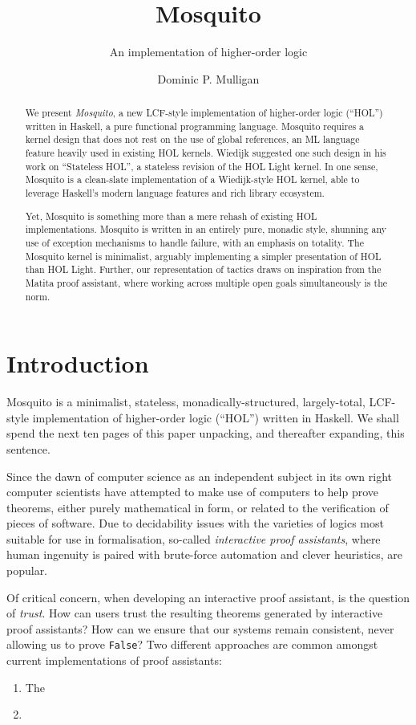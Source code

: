 \documentclass{llncs}
\author{Dominic P. Mulligan}
\title{Mosquito}
\subtitle{An implementation of higher-order logic}
\institute{Computer Laboratory, University of Cambridge}
\begin{document}
\maketitle

\begin{abstract}
We present \emph{Mosquito}, a new LCF-style implementation of higher-order logic (``HOL'') written in Haskell, a pure functional programming language.
Mosquito requires a kernel design that does not rest on the use of global references, an ML language feature heavily used in existing HOL kernels.
Wiedijk suggested one such design in his work on ``Stateless HOL'', a stateless revision of the HOL Light kernel.
In one sense, Mosquito is a clean-slate implementation of a Wiedijk-style HOL kernel, able to leverage Haskell's modern language features and rich library ecosystem.

Yet, Mosquito is something more than a mere rehash of existing HOL implementations.
Mosquito is written in an entirely pure, monadic style, shunning any use of exception mechanisms to handle failure, with an emphasis on totality.
The Mosquito kernel is minimalist, arguably implementing a simpler presentation of HOL than HOL Light.
Further, our representation of tactics draws on inspiration from the Matita proof assistant, where working across multiple open goals simultaneously is the norm.
\end{abstract}

\section{Introduction}
\label{sect.introduction}

Mosquito is a minimalist, stateless, monadically-structured, largely-total, LCF-style implementation of higher-order logic (``HOL'') written in Haskell.
We shall spend the next ten pages of this paper unpacking, and thereafter expanding, this sentence.

Since the dawn of computer science as an independent subject in its own right computer scientists have attempted to make use of computers to help prove theorems, either purely mathematical in form, or related to the verification of pieces of software.
Due to decidability issues with the varieties of logics most suitable for use in formalisation, so-called \emph{interactive proof assistants}, where human ingenuity is paired with brute-force automation and clever heuristics, are popular.

Of critical concern, when developing an interactive proof assistant, is the question of \emph{trust}.
How can users trust the resulting theorems generated by interactive proof assistants?
How can we ensure that our systems remain consistent, never allowing us to prove \texttt{False}?
Two different approaches are common amongst current implementations of proof assistants:
\begin{enumerate}
\item
The 
\item
\end{enumerate}
\end{document}
